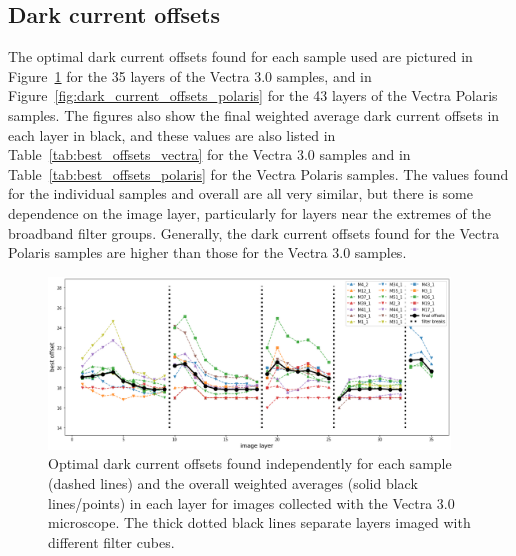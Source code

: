 \documentclass[letterpaper,11pt]{article}
\newcommand{\reffig}[1]{Figure~\ref{#1}}
\newcommand{\reftab}[1]{Table~\ref{#1}}
\begin{document}
\subsection{Dark current offsets}
\label{ssec:dark_current_offsets}

The optimal dark current offsets found for each sample used are pictured in \reffig{fig:dark_current_offsets_vectra} for the 35 layers of the Vectra 3.0 samples, and in \reffig{fig:dark_current_offsets_polaris} for the 43 layers of the Vectra Polaris samples. The figures also show the final weighted average dark current offsets in each layer in black, and these values are also listed in \reftab{tab:best_offsets_vectra} for the Vectra 3.0 samples and in \reftab{tab:best_offsets_polaris} for the Vectra Polaris samples. The values found for the individual samples and overall are all very similar, but there is some dependence on the image layer, particularly for layers near the extremes of the broadband filter groups. Generally, the dark current offsets found for the Vectra Polaris samples are higher than those for the Vectra 3.0 samples.

\begin{figure}[!ht]
\centering
\includegraphics[width=0.95\textwidth]{images/results/dark_current_offsets_vectra}
\caption{\footnotesize Optimal dark current offsets found independently for each sample (dashed lines) and the overall weighted averages (solid black lines/points) in each layer for images collected with the Vectra 3.0 microscope. The thick dotted black lines separate layers imaged with different filter cubes.}
\label{fig:dark_current_offsets_vectra}
\end{figure}
\end{document}
